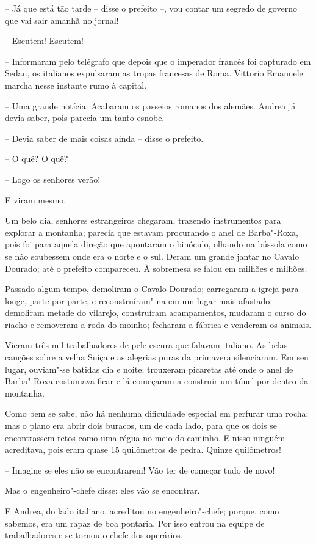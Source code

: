-- Já que está tão tarde -- disse o prefeito --, vou contar um segredo de
governo que vai sair amanhã no jornal!

-- Escutem! Escutem!

-- Informaram pelo telégrafo que depois que o imperador francês foi
capturado em Sedan, os italianos expulsaram as tropas francesas de
Roma. Vittorio Emanuele marcha nesse instante rumo à capital.

-- Uma grande notícia. Acabaram os passeios romanos dos alemães. Andrea
já devia saber, pois parecia um tanto esnobe.

-- Devia saber de mais coisas ainda -- disse o prefeito.

-- O quê? O quê?

-- Logo os senhores verão!

E viram mesmo.
\asterisc

Um belo dia, senhores estrangeiros chegaram, trazendo instrumentos para
explorar a montanha; parecia que estavam procurando o anel de
Barba"-Roxa, pois foi para aquela direção que apontaram o binóculo,
olhando na bússola como se não soubessem onde era o norte e o sul.
Deram um grande jantar no Cavalo Dourado; até o prefeito compareceu. À
sobremesa se falou em milhões e milhões.

Passado algum tempo, demoliram o Cavalo Dourado; carregaram a igreja
para longe, parte por parte, e reconstruíram"-na em um lugar mais
afastado; demoliram metade do vilarejo, construíram acampamentos,
mudaram o curso do riacho e removeram a roda do moinho; fecharam a
fábrica e venderam os animais.

Vieram três mil trabalhadores de pele escura que falavam italiano. As
belas canções sobre a velha Suíça e as alegrias puras da primavera
silenciaram. Em seu lugar, ouviam"-se batidas dia e noite; trouxeram
picaretas até onde o anel de Barba"-Roxa costumava ficar e lá
começaram a construir um túnel por dentro da montanha.

Como bem se sabe, não há nenhuma dificuldade especial em perfurar uma
rocha; mas o plano era abrir dois buracos, um de cada lado, para que os
dois se encontrassem retos como uma régua no meio do caminho. E nisso
ninguém acreditava, pois eram quase 15 quilômetros de pedra. Quinze quilômetros!

-- Imagine se eles não se encontrarem! Vão ter de começar tudo de novo!

Mas o engenheiro"-chefe disse: eles vão se encontrar.

E Andrea, do lado italiano, acreditou no engenheiro"-chefe; porque,
como sabemos, era um rapaz de boa pontaria. Por isso entrou na equipe
de trabalhadores e se tornou o chefe dos operários.

